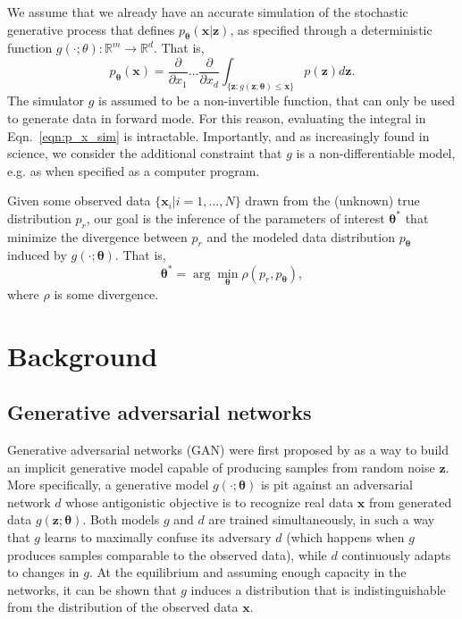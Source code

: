\documentclass[twocolumn,superscriptaddress,aps]{revtex4-1}
\theoremstyle{plain}
\begin{document}
We assume that we already have an accurate simulation of the stochastic generative process
that defines $p_\mathbf{\theta}(\mathbf{x}|\mathbf{z})$, as specified through a deterministic function $g(\cdot;
\theta) : \mathbb{R}^m \to \mathbb{R}^d$. That is,
\begin{equation}\label{eqn:p_x_sim}
    p_\mathbf{\theta}(\mathbf{x}) = \frac{\partial}{\partial x_1} \dots \frac{\partial}{\partial x_d} \int_{\{\mathbf{z}:g(\mathbf{z};\mathbf{\theta}) \leq \mathbf{x}\}} p(\mathbf{z}) d\mathbf{z}.
\end{equation}
The simulator $g$ is assumed to be a non-invertible function, that can
only be used to generate data in forward mode.
For this reason, evaluating the integral in Eqn.~\ref{eqn:p_x_sim} is intractable.
Importantly, and as increasingly found in science, we consider the additional constraint that $g$ is a non-differentiable
model, e.g. as when specified as a computer program.

Given some observed data $\{ \mathbf{x}_i | i=1, \dots, N \}$ drawn from the (unknown) true distribution $p_r$, our goal is the inference
of the parameters of interest $\mathbf{\theta}^*$ that minimize the divergence
between $p_r$ and the modeled
data distribution $p_\mathbf{\theta}$ induced by $g(\cdot; \mathbf{\theta})$. That is,
\begin{equation}
    \mathbf{\theta}^* = \arg \min_\mathbf{\theta} \rho(p_r, p_\mathbf{\theta}),
\end{equation}
where $\rho$ is some divergence.



\section{Background}

\subsection{Generative adversarial networks}

Generative adversarial networks (GAN) were first proposed by
\cite{goodfellow2014generative} as a way to build an implicit generative model
capable of producing samples from random noise $\mathbf{z}$. More specifically,
a generative model $g(\cdot; \mathbf{\theta})$ is pit against an adversarial
network $d$ whose antigonistic objective is to recognize real data $\mathbf{x}$
from generated data $g(\mathbf{z}; \mathbf{\theta})$. Both models $g$ and $d$
are trained simultaneously, in such a way that $g$ learns to maximally confuse
its adversary $d$ (which happens when $g$ produces samples comparable to the
observed data), while $d$ continuously adapts to changes in $g$. At the
equilibrium and assuming enough capacity in the networks, it can be shown that
$g$ induces a distribution  that is indistinguishable from the distribution of
the observed data $\mathbf{x}$.
\end{document}
